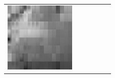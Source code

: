 \documentclass[11pt,a4paper,openright,oneside]{book}
\numberwithin{equation}{section}
\begin{document}
{\begin{figure}[h]
\begin{adjustwidth}{-3cm}{-3cm}
\begin{tabular}{>{\centering\arraybackslash}m{1.5cm} m{2.5cm} m{2.5cm} m{2.5cm} m{2.5cm} m{2.5cm}}
        \includegraphics[width=\linewidth]{media/tnale/AAAfruits-comp5-ale-0.5.png} \\


\end{tabular}
\end{adjustwidth}
\end{figure}}
\end{document}
